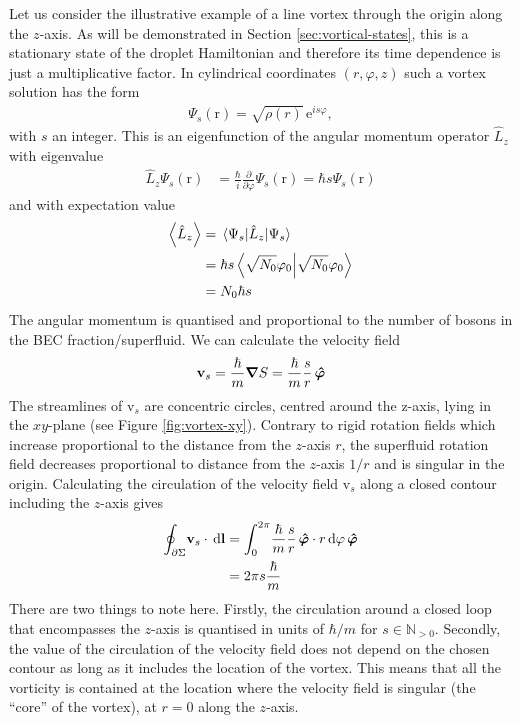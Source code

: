 \documentclass[12pt,a4paper,twosides]{book}
\renewcommand{\vec}[1]{\bm{\mathrm{#1}}}
\newcommand{\unit}[1]{\,\mathrm{#1}}
\begin{document}
			Let us consider the illustrative example of a line vortex through the origin along the $z$-axis. As will be demonstrated in Section \ref{sec:vortical-states}, this is a stationary state of the droplet Hamiltonian and therefore its time dependence is just a multiplicative factor. In cylindrical coordinates $(r,\varphi,z)$ such a vortex solution has the form
			\begin{align}
				\Psi_s(\vec{r}) = \sqrt{\rho(r)}\unit{e}^{is\varphi}, \label{eq:line-vortex}
			\end{align}
			with $s$ an integer. This is an eigenfunction of the angular momentum operator $\hat{L}_z$ with eigenvalue
			\begin{align}
				\hat{L}_z \Psi_s(\vec{r}) &= \frac{\hbar}{i}\frac{\partial}{\partial\varphi}\Psi_s(\vec{r}) = \hbar s\Psi_s(\vec{r})
			\end{align}
			and with expectation value
			\begin{align}
				\expval{\hat{L}_z} &= \expval{\hat{L}_z}{\Psi_s} \\
					&= \hbar s \braket{\sqrt{N_0}\varphi_0} \\
					&= N_0\hbar s
			\end{align}
			The angular momentum is quantised and proportional to the number of bosons in the BEC fraction/superfluid. We can calculate the velocity field
			\begin{align}
				\vec{v}_s = \frac{\hbar}{m}\grad{S} = \frac{\hbar}{m}\frac{s}{r}\,\vu*{\varphi}
			\end{align}
			The streamlines of $\vec{v}_s$ are concentric circles, centred around the z-axis, lying in the $xy$-plane (see Figure \ref{fig:vortex-xy}). Contrary to rigid rotation fields which increase proportional to the distance from the $z$-axis $r$, the superfluid rotation field decreases proportional to distance from the $z$-axis $1/r$ and is singular in the origin. Calculating the circulation of the velocity field $\vec{v}_s$ along a closed contour including the $z$-axis gives
			\begin{align}
				\oint_{\partial\Sigma}\!\vec{v}_s\cdot\unit{d}\vec{l} &=
				\int_{0}^{2\pi}\!\frac{\hbar}{m}\frac{s}{r}\,\vu*{\varphi}\cdot r\unit{d}\varphi\,\vu*{\varphi} \\
					&= 2\pi s\frac{\hbar}{m}
			\end{align}
			There are two things to note here. Firstly, the circulation around a closed loop that encompasses the $z$-axis is quantised in units of $\hbar/m$ for $s\in\mathbb{N}_{>0}$. Secondly, the value of the circulation of the velocity field does not depend on the chosen contour as long as it includes the location of the vortex. This means that all the vorticity is contained at the location where the velocity field is singular (the ``core'' of the vortex), at $r=0$ along the $z$-axis.\\
			
\end{document}
